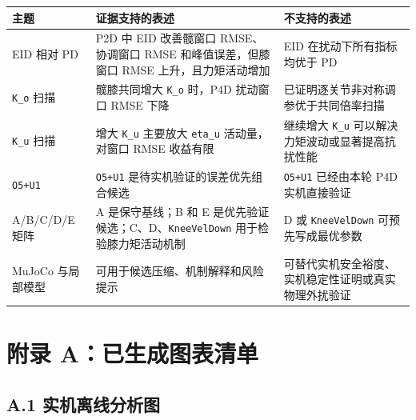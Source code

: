 \begin{longtable}[]{@{}
  >{\raggedright\arraybackslash}p{}
  >{\raggedright\arraybackslash}p{}
  >{\raggedright\arraybackslash}p{}@{}}
\toprule\noalign{}
\begin{minipage}[b]{\linewidth}\raggedright
主题
\end{minipage} & \begin{minipage}[b]{\linewidth}\raggedright
证据支持的表述
\end{minipage} & \begin{minipage}[b]{\linewidth}\raggedright
不支持的表述
\end{minipage} \\
\midrule\noalign{}
\endhead
\bottomrule\noalign{}
\endlastfoot
EID 相对 PD & P2D 中 EID 改善髋窗口 RMSE、协调窗口 RMSE 和峰值误差，但膝窗口 RMSE 上升，且力矩活动增加 & EID 在扰动下所有指标均优于 PD \\
\texttt{K\_o} 扫描 & 髋膝共同增大 \texttt{K\_o} 时，P4D 扰动窗口 RMSE 下降 & 已证明逐关节非对称调参优于共同倍率扫描 \\
\texttt{K\_u} 扫描 & 增大 \texttt{K\_u} 主要放大 \texttt{eta\_u} 活动量，对窗口 RMSE 收益有限 & 继续增大 \texttt{K\_u} 可以解决力矩波动或显著提高抗扰性能 \\
\texttt{O5+U1} & \texttt{O5+U1} 是待实机验证的误差优先组合候选 & \texttt{O5+U1} 已经由本轮 P4D 实机直接验证 \\
A/B/C/D/E 矩阵 & A 是保守基线；B 和 E 是优先验证候选；C、D、\texttt{KneeVelDown} 用于检验膝力矩活动机制 & D 或 \texttt{KneeVelDown} 可预先写成最优参数 \\
MuJoCo 与局部模型 & 可用于候选压缩、机制解释和风险提示 & 可替代实机安全裕度、实机稳定性证明或真实物理外扰验证 \\
\end{longtable}

\section{附录 A：已生成图表清单}\label{ux9644ux5f55-aux5df2ux751fux6210ux56feux8868ux6e05ux5355}

\subsection{A.1 实机离线分析图}\label{a.1-ux5b9eux673aux79bbux7ebfux5206ux6790ux56fe}

